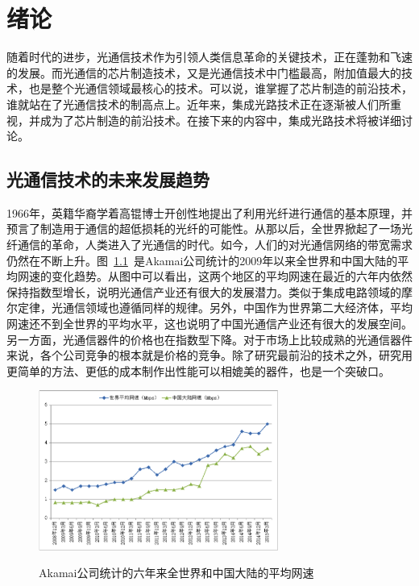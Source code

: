 \documentclass{ZJUthesis}
\begin{document}
\chapter{绪论}

随着时代的进步，光通信技术作为引领人类信息革命的关键技术，正在蓬勃和飞速的发展。而光通信的芯片制造技术，又是光通信技术中门槛最高，附加值最大的技术，也是整个光通信领域最核心的技术。可以说，谁掌握了芯片制造的前沿技术，谁就站在了光通信技术的制高点上。近年来，集成光路技术正在逐渐被人们所重视，并成为了芯片制造的前沿技术。在接下来的内容中，集成光路技术将被详细讨论。

\section{光通信技术的未来发展趋势}

1966年，英籍华裔学着高锟博士开创性地提出了利用光纤进行通信的基本原理，并预言了制造用于通信的超低损耗的光纤的可能性\cite{kao1966dielectric}。从那以后，全世界掀起了一场光纤通信的革命，人类进入了光通信的时代。如今，人们的对光通信网络的带宽需求仍然在不断上升。图~\ref{fig_akamai}~是Akamai公司统计的2009年以来全世界和中国大陆的平均网速的变化趋势。从图中可以看出，这两个地区的平均网速在最近的六年内依然保持指数型增长，说明光通信产业还有很大的发展潜力。类似于集成电路领域的摩尔定律，光通信领域也遵循同样的规律。另外，中国作为世界第二大经济体，平均网速还不到全世界的平均水平，这也说明了中国光通信产业还有很大的发展空间。另一方面，光通信器件的价格也在指数型下降。对于市场上比较成熟的光通信器件来说，各个公司竞争的根本就是价格的竞争。除了研究最前沿的技术之外，研究用更简单的方法、更低的成本制作出性能可以相媲美的器件，也是一个突破口。

\begin{figure}[htbp]
  \centering
  \includegraphics[width=0.7\textwidth]{./Pictures/akamai.eps}\\
  \caption{Akamai公司统计的六年来全世界和中国大陆的平均网速}
  \label{fig_akamai}
\end{figure}
\end{document}
